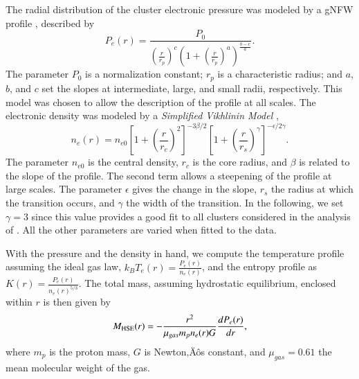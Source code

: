 \documentclass[traditabstract]{aa}
\begin{document}
The radial distribution of the cluster electronic pressure was modeled by a gNFW profile \citep{nagai2007}, described by
\begin{equation}
        P_e(r) = \frac{P_0}{\left(\frac{r}{r_p}\right)^c \left(1+\left(\frac{r}{r_p}\right)^a\right)^{\frac{b-c}{a}}}.
\label{eq:gNFW}
\end{equation}
The parameter $P_0$ is a normalization constant; $r_p$ is a characteristic radius; and $a$, $b$, and $c$ set the slopes at intermediate, large, and small radii, respectively. This model was chosen to allow the description of the profile at all scales. The electronic density was modeled by a \emph{Simplified Vikhlinin Model} \citep{vikhlinin2006},
\begin{equation}
        n_e(r) = n_{e0} \left[1+\left(\frac{r}{r_c}\right)^2 \right]^{-3 \beta /2} \left[ 1+\left(\frac{r}{r_s}\right)^{\gamma} \right]^{-\epsilon/2 \gamma}.
\label{eq:SVM}
\end{equation}
The parameter $n_{e0}$ is the central density, $r_c$ is the core radius, and $\beta$ is related to the slope of the profile. The second term allows a steepening of the profile at large scales. The parameter $\epsilon$ gives the change in the slope, $r_s$ the radius at which the transition occurs, and $\gamma$ the width of the transition. In the following, we set $\gamma = 3$ since this value provides a good fit to all clusters considered in the analysis of \cite{vikhlinin2006}. All the other parameters are varied when fitted to the data.

With the pressure and the density in hand, we compute the temperature profile assuming the ideal gas law, $k_B T_e(r) = \frac{P_e(r)}{n_e(r)}$, and the entropy profile as $K(r) =  \frac{P_e(r)}{n_e(r)^{5/3}}$. The total mass, assuming hydrostatic equilibrium, enclosed within $r$ is then given by 
\begin{equation}
M_{\rm HSE}(r) = -\frac{r^2}{\mu_{gas} m_p n_e(r) G} \frac{dP_e(r)}{dr}
,\end{equation}
where $m_p$ is the proton mass, $G$ is Newton‚Äôs constant, and $\mu_{gas} = 0.61$ the mean molecular weight of the gas.
\end{document}
